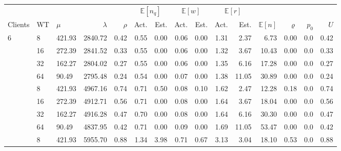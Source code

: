         \begin{table}
            \begin{adjustwidth}{-1cm}{}
                \footnotesize{
                    \begin{tabular}{lllrrrrrrrrrrrr}
                        \toprule
                        & & & & & \multicolumn{2}{c}{$\mathbb{E}[n_q]$} & \multicolumn{2}{c}{$\mathbb{E}[w]$} & \multicolumn{2}{c}{$\mathbb{E}[r]$} & &  & & \\
                        \cmidrule(lr){6-7}
                        \cmidrule(lr){8-9}
                        \cmidrule(lr){10-11}
                        Clients & WT & $\mu$      & $\lambda$ & $\rho$ & Act.   & Est.   & Act.  & Est.  & Act.  & Est.  & $\mathbb{E}[n]$ & $\varrho$ & $p_0$ & $U$ \\
                        \midrule
                        6       & 8  & 421.93 & 2840.72   & 0.42   & 0.55   & 0.00   & 0.06  & 0.00  & 1.31  & 2.37  & 6.73            & 0.00      & 0.0   & 0.42 \\
                                & 16 & 272.39 & 2841.52   & 0.33   & 0.55   & 0.00   & 0.06  & 0.00  & 1.32  & 3.67  & 10.43           & 0.00      & 0.0   & 0.33 \\
                                & 32 & 162.27 & 2804.02   & 0.27   & 0.55   & 0.00   & 0.06  & 0.00  & 1.35  & 6.16  & 17.28           & 0.00      & 0.0   & 0.27 \\
                                & 64 & 90.49  & 2795.48   & 0.24   & 0.54   & 0.00   & 0.07  & 0.00  & 1.38  & 11.05 & 30.89           & 0.00      & 0.0   & 0.24 \\
                        \addlinespace
                        12      & 8  & 421.93 & 4967.16   & 0.74   & 0.71   & 0.50   & 0.08  & 0.10  & 1.62  & 2.47  & 12.28           & 0.18      & 0.0   & 0.74 \\
                                & 16 & 272.39 & 4912.71   & 0.56   & 0.71   & 0.00   & 0.08  & 0.00  & 1.64  & 3.67  & 18.04           & 0.00      & 0.0   & 0.56 \\
                                & 32 & 162.27 & 4916.28   & 0.47   & 0.70   & 0.00   & 0.08  & 0.00  & 1.64  & 6.16  & 30.30           & 0.00      & 0.0   & 0.47 \\
                                & 64 & 90.49  & 4837.95   & 0.42   & 0.71   & 0.00   & 0.09  & 0.00  & 1.69  & 11.05 & 53.47           & 0.00      & 0.0   & 0.42 \\
                        \addlinespace
                        24      & 8  & 421.93 & 5955.70   & 0.88   & 1.34   & 3.98   & 0.71  & 0.67  & 3.13  & 3.04  & 18.10           & 0.53      & 0.0   & 0.88 \\

\end{tabular}}
\end{adjustwidth}
\end{table}
